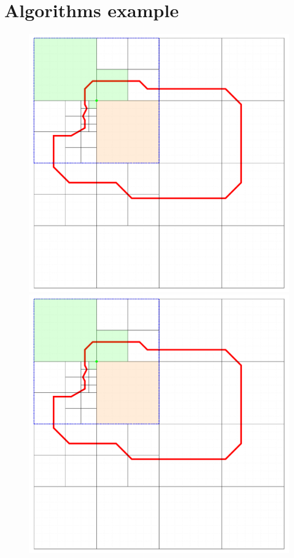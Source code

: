 \documentclass{article}
\begin{document}
    \section*{Algorithms example}
    \begin{figure}[h!]
        \centering
        \includegraphics[page=1, width=0.475\linewidth]{Figures/Example}
        \includegraphics[page=2, width=0.475\linewidth]{Figures/Example}
    \end{figure}
\end{document}
